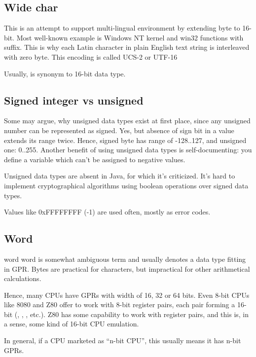 \subsection{Wide char}

This is an attempt to support multi-lingual environment by extending byte to 16-bit.
Most well-known example is Windows NT kernel and win32 functions with  suffix.
This is why each Latin character in plain English text string is interleaved with zero byte.
This encoding is called UCS-2 or UTF-16

Usually,  is synonym to 16-bit  data type.

\subsection{Signed integer vs unsigned}

Some may argue, why unsigned data types exist at first place, since any unsigned number can be represented as signed.
Yes, but absence of sign bit in a value extends its range twice.
Hence, signed byte has range of -128..127, and unsigned one: 0..255.
Another benefit of using unsigned data types is self-documenting:
you define a variable which can't be assigned to negative values.

Unsigned data types are absent in Java, for which it's criticized.
It's hard to implement cryptographical algorithms using boolean operations over signed data types.

Values like 0xFFFFFFFF (-1) are used often, mostly as error codes.

\subsection{Word}

\Gls{word} word is somewhat ambiguous term and usually denotes a data type fitting in \ac{GPR}.
Bytes are practical for characters, but impractical for other arithmetical calculations.

Hence, many \ac{CPU}s have \ac{GPR}s with width of 16, 32 or 64 bits.
Even 8-bit CPUs like 8080 and Z80 offer to work with 8-bit register pairs, each pair forming a 16-bit 
(, , , etc.).
Z80 has some capability to work with register pairs, and this is, in a sense, some kind of 16-bit CPU emulation.

In general, if a CPU marketed as ``n-bit CPU'', this usually means it has n-bit \ac{GPR}s.

